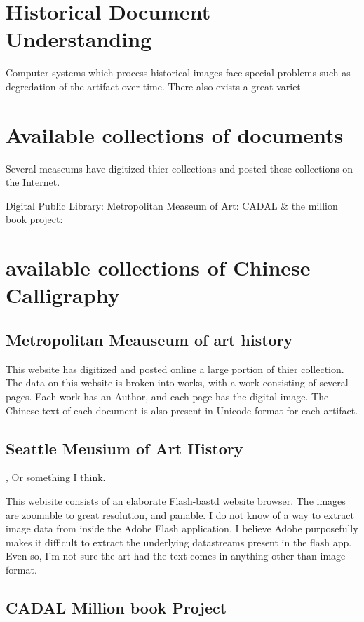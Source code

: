 \section{Historical Document Understanding}

Computer systems which process historical images face special problems such as degredation of the artifact over time.  There also exists a great variet


\section{Available collections of documents}

Several measeums have digitized thier collections and posted these collections on the Internet.

Digital Public Library:
Metropolitan Measeum of Art:
CADAL \& the million book project:

\section{available collections of Chinese Calligraphy}

\subsection{Metropolitan Meauseum of art history}

This website has digitized and posted online a large portion of thier collection.  The data on this website is broken into works, with a work consisting of several pages.  Each work has an Author, and each page has the digital image.  The Chinese text of each document is also present in Unicode format for each artifact.

\subsection{Seattle Meusium of Art History}, Or something I think.

This webisite consists of an elaborate Flash-bastd website browser.  The images are zoomable to great resolution, and panable.  I do not know of a way to extract image data from inside the Adobe Flash application.  I believe Adobe purposefully makes it difficult to extract the underlying datastreams present in the flash app.
Even so, I'm not sure the art had the text comes in anything other than image format.

\subsection{CADAL Million book Project}

